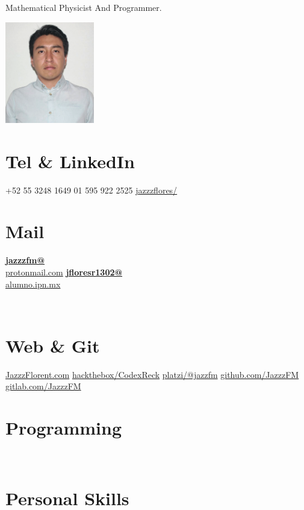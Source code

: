 \documentclass[]{friggeri-cv}
\begin{document}
      {Mathematical Physicist And Programmer. }
      

\begin{aside}
  \includegraphics[width=3.9cm]{jejejejejej.png}
  \section{Tel \& LinkedIn}
    +52 55 3248 1649
    01 595 922 2525
\href{https://www.linkedin.com/in/jazzzflores/}{jazzzflores/}    
    ~
  \section{Mail}
    \href{mailto:jazzzfm@protonmail.com}{\textbf{jazzzfm@}\\protonmail.com}
    \href{mailto:jfloresr1302@alumno.ipn.mx}{\textbf{jfloresr1302@}\\alumno.ipn.mx}

    ~
  \section{Web \& Git}
    \href{https://medium.com/@jazzesfm}{JazzzFlorent.com}
   \href{https://www.hackthebox.eu/profile/171317}{hackthebox/CodexReck}
   \href{https://platzi.com/@jazzfm/}{platzi/@jazzfm}   
   \href{https://github.com/JazzzFM}{github.com/JazzzFM}
   \href{https://gitlab.com/u/JazzzFM?}{gitlab.com/JazzzFM}
    ~
  \section{Programming}
    ~
  \section{Personal Skills}
    ~
\end{aside}
~
\end{document}
